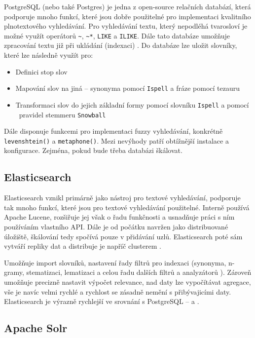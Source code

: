 \documentclass[FM,DP]{tulthesis}
\begin{document}
PostgreSQL (nebo také Postgres) je jedna z open-source relačních databází, která podporuje
mnoho funkcí, které jsou dobře použitelné pro implementaci kvalitního plnotextového 
vyhledávání. Pro vyhledávání textu, který nepodléhá tvarosloví je možné využít operátorů
\verb|~|, \verb|~*|, \verb|LIKE| a \verb|ILIKE|. Dále tato databáze umožňuje zpracování
textu již při ukládání (indexaci) \cite{postgres-search}. Do databáze lze uložit slovníky, 
které lze následně využít pro:

\begin{itemize}
\item Definici stop slov
\item Mapování slov na jiná -- synonyma pomocí \verb|Ispell| a fráze pomocí tezauru
\item Transformaci slov do jejich základní formy pomocí slovníku \verb|Ispell| a pomocí \
pravidel stemmeru \verb|Snowball|
\end{itemize}

Dále disponuje funkcemi pro implementaci fuzzy vyhledávání, konkrétně \verb|levenshtein()|
a \verb|metaphone()|. Mezi nevýhody patří obtížnější instalace a konfigurace. Zejména, 
pokud bude třeba databázi škálovat.

\subsection{Elasticsearch}

Elasticsearch vznikl primárně jako nástroj pro textové vyhledávání, podporuje tak
mnoho funkcí, které jsou pro textové vyhledávání použitelné. Interně používá
Apache Lucene, rozšiřuje jej však o řadu funkčnosti a usnadňuje práci s ním
používáním vlastního API. Dále je od počátku navržen jako distribuované úložiště, 
škálování tedy spočívá pouze v přidávání uzlů. Elasticsearch poté sám vytváří
repliky dat a distribuje je napříč clusterem \cite{elastic}. 

Umožňuje import slovníků, nastavení řady filtrů pro indexaci (synonyma, n-gramy, stematizaci, 
lematizaci a celou řadu dalších filtrů a analyzátorů \cite{es-analysis}). Zároveň umožňuje
precizně nastavit výpočet relevance, nad daty lze vypočítávat agregace, vše je navíc
velmi rychlé a rychlost se zásadně nemění s přibývajicími daty. Elasticsearch je výrazně 
rychlejší ve srovnání s PostgreSQL -- \cite{es-postgres} a \cite{es-postgres-2}.

\subsection{Apache Solr}
\end{document}
